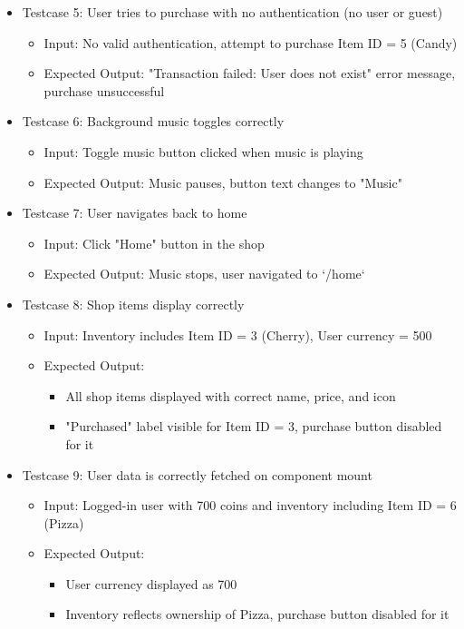 \begin{itemize}
    \item Testcase 5: User tries to purchase with no authentication (no user or guest)
    \begin{itemize}
        \item Input: No valid authentication, attempt to purchase Item ID = 5 (Candy)
        \item Expected Output: "Transaction failed: User does not exist" error message, purchase unsuccessful
    \end{itemize}

    \item Testcase 6: Background music toggles correctly
    \begin{itemize}
        \item Input: Toggle music button clicked when music is playing
        \item Expected Output: Music pauses, button text changes to "Music"
    \end{itemize}

    \item Testcase 7: User navigates back to home
    \begin{itemize}
        \item Input: Click "Home" button in the shop
        \item Expected Output: Music stops, user navigated to `/home`
    \end{itemize}

    \item Testcase 8: Shop items display correctly
    \begin{itemize}
        \item Input: Inventory includes Item ID = 3 (Cherry), User currency = 500
        \item Expected Output:
        \begin{itemize}
            \item All shop items displayed with correct name, price, and icon
            \item "Purchased" label visible for Item ID = 3, purchase button disabled for it
        \end{itemize}
    \end{itemize}

    \item Testcase 9: User data is correctly fetched on component mount
    \begin{itemize}
        \item Input: Logged-in user with 700 coins and inventory including Item ID = 6 (Pizza)
        \item Expected Output:
        \begin{itemize}
            \item User currency displayed as 700
            \item Inventory reflects ownership of Pizza, purchase button disabled for it
        \end{itemize}
    \end{itemize}
\end{itemize}
\pagebreak